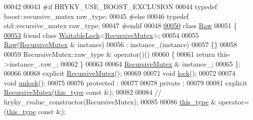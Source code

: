 \begin{DoxyCode}
00042 
00043 \textcolor{preprocessor}{#if HRYKY\_USE\_BOOST\_EXCLUSION}
00044 \textcolor{preprocessor}{}    \textcolor{keyword}{typedef} boost::recursive\_mutex  raw\_type;
00045 \textcolor{preprocessor}{#else}
00046 \textcolor{preprocessor}{}    \textcolor{keyword}{typedef} std::recursive\_mutex    raw\_type;
00047 \textcolor{preprocessor}{#endif}
00048 \textcolor{preprocessor}{}
\hypertarget{exclusion__recursive__mutex_8h_source_l00050}{}\hyperlink{classhryky_1_1exclusion_1_1_recursive_mutex_1_1_raw}{00050}     \textcolor{keyword}{class }\hyperlink{classhryky_1_1exclusion_1_1_recursive_mutex_1_1_raw}{Raw}
00051     \{
\hypertarget{exclusion__recursive__mutex_8h_source_l00053}{}\hyperlink{classhryky_1_1exclusion_1_1_recursive_mutex_1_1_raw_aea23ddc6e8a58b6b3a204031d713c9e5}{00053}         \textcolor{keyword}{friend} \textcolor{keyword}{class }\hyperlink{classhryky_1_1exclusion_1_1_waitable_lock}{WaitableLock}<\hyperlink{classhryky_1_1exclusion_1_1_recursive_mutex}{RecursiveMutex}>;
00054         
00055         \hyperlink{classhryky_1_1exclusion_1_1_recursive_mutex_1_1_raw}{Raw}(\hyperlink{classhryky_1_1exclusion_1_1_recursive_mutex}{RecursiveMutex} & instance)
00056             : instance\_(instance)
00057         \{\}
00058         
00059         RecursiveMutex::raw\_type & operator()()
00060         \{
00061             \textcolor{keywordflow}{return} this->instance\_.raw\_;
00062         \}
00063 
00064         \hyperlink{classhryky_1_1exclusion_1_1_recursive_mutex}{RecursiveMutex} & instance\_;
00065     \};
00066 
00068     \textcolor{keyword}{explicit} \hyperlink{classhryky_1_1exclusion_1_1_recursive_mutex_ad2ca9247d6d3865a04cb792c5e98bf58}{RecursiveMutex}();
00069 
00071     \textcolor{keywordtype}{void} \hyperlink{classhryky_1_1exclusion_1_1_recursive_mutex_a60ff5674a9b3ab8a01151450ee99a052}{lock}();
00072 
00074     \textcolor{keywordtype}{void} \hyperlink{classhryky_1_1exclusion_1_1_recursive_mutex_aee17540d5f888dee1594f27b074b4078}{unlock}();
00075 
00076 \textcolor{keyword}{protected} :
00077 
00078 \textcolor{keyword}{private} :
00079 
00081     \textcolor{keyword}{explicit} \hyperlink{classhryky_1_1exclusion_1_1_recursive_mutex_ad2ca9247d6d3865a04cb792c5e98bf58}{RecursiveMutex}(\hyperlink{classhryky_1_1exclusion_1_1_recursive_mutex_afc05f6bc3336fc6a5830bd3a7cc9b397}{this_type} \textcolor{keyword}{const} &);
00082 
00084     \textcolor{comment}{// hryky\_rvalue\_constructor(RecursiveMutex);}
00085 
00086     \hyperlink{classhryky_1_1exclusion_1_1_recursive_mutex_afc05f6bc3336fc6a5830bd3a7cc9b397}{this_type} & operator=(\hyperlink{classhryky_1_1exclusion_1_1_recursive_mutex_afc05f6bc3336fc6a5830bd3a7cc9b397}{this_type} \textcolor{keyword}{const} &);

\end{DoxyCode}
